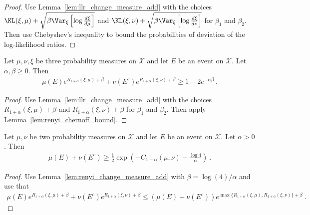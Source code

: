 \begin{proof} %
{}
Use Lemma~\ref{lem:llr_change_measure_add} with the choices $\KL(\xi, \mu) + \sqrt{\beta \Var_{\xi}\left[\log\frac{d\xi}{d\mu}\right]}$ and $\KL(\xi, \nu) + \sqrt{\beta \Var_{\xi}\left[\log\frac{d\xi}{d\nu}\right]}$ for $\beta_1$ and $\beta_2$.
Then use Chebyshev's inequality to bound the probabilities of deviation of the log-likelihood ratios.
\end{proof}

\begin{lemma}
  \label{lem:renyi_change_measure_add}
  \leanok
  Let $\mu, \nu, \xi$ be three probability measures on $\mathcal X$ and let $E$ be an event on $\mathcal X$. Let $\alpha, \beta \ge 0$. Then
  \begin{align*}
  \mu(E) e^{R_{1+\alpha}(\xi, \mu) + \beta} + \nu(E^c) e^{R_{1+\alpha}(\xi, \nu) + \beta} \ge 1 - 2 e^{-\alpha \beta} \: .
  \end{align*}
\end{lemma}

\begin{proof}\leanok
{}
Use Lemma~\ref{lem:llr_change_measure_add} with the choices $R_{1+\alpha}(\xi, \mu) + \beta$ and $R_{1+\alpha}(\xi, \nu) + \beta$ for $\beta_1$ and $\beta_2$.
Then apply Lemma~\ref{lem:renyi_chernoff_bound}.
\end{proof}


\begin{lemma}
  \label{lem:testing_bound_renyi_one_add}
  Let $\mu, \nu$ be two probability measures on $\mathcal X$ and let $E$ be an event on $\mathcal X$. Let $\alpha > 0$. Then
  \begin{align*}
  \mu(E) + \nu(E^c) \ge \frac{1}{2}\exp\left( - C_{1+\alpha}(\mu, \nu) - \frac{\log 4}{\alpha}\right) \: .
  \end{align*}
\end{lemma}

\begin{proof}%
{}
Use Lemma~\ref{lem:renyi_change_measure_add} with $\beta = \log(4)/\alpha$ and use that
\begin{align*}
\mu(E) e^{R_{1+\alpha}(\xi, \mu) + \beta} + \nu(E^c) e^{R_{1+\alpha}(\xi, \nu) + \beta}
\le (\mu(E) + \nu(E^c)) e^{\max \{R_{1+\alpha}(\xi, \mu), R_{1+\alpha}(\xi, \nu)\} + \beta}
\: .
\end{align*}

\end{proof}



